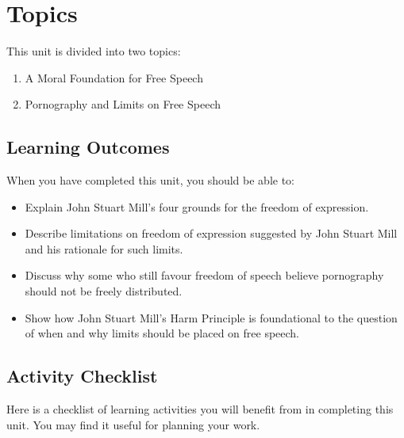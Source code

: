 \documentclass[
]{book}
\providecommand{\tightlist}{%
  \setlength{\itemsep}{0pt}\setlength{\parskip}{0pt}}
\begin{document}
\hypertarget{topics-4}{%
\section*{Topics}\label{topics-4}}

This unit is divided into two topics:

\begin{enumerate}
\def\labelenumi{\arabic{enumi}.}
\tightlist
\item
  A Moral Foundation for Free Speech\\
\item
  Pornography and Limits on Free Speech
\end{enumerate}

\hypertarget{learning-outcomes-4}{%
\subsection*{Learning Outcomes}\label{learning-outcomes-4}}

When you have completed this unit, you should be able to:

\begin{itemize}
\tightlist
\item
  Explain John Stuart Mill's four grounds for the freedom of expression.\\
\item
  Describe limitations on freedom of expression suggested by John Stuart Mill and his rationale for such limits.\\
\item
  Discuss why some who still favour freedom of speech believe pornography should not be freely distributed.\\
\item
  Show how John Stuart Mill's Harm Principle is foundational to the question of when and why limits should be placed on free speech.
\end{itemize}

\hypertarget{activity-checklist-4}{%
\subsection*{Activity Checklist}\label{activity-checklist-4}}

Here is a checklist of learning activities you will benefit from in completing
this unit. You may find it useful for planning your work.
\end{document}
